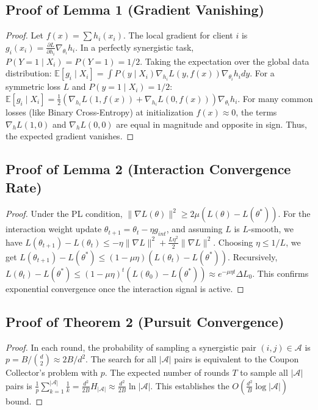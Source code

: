 \documentclass{article}
\theoremstyle{plain}
\theoremstyle{definition}
\newcommand{\E}{\mathbb{E}}
\begin{document}
\subsection{Proof of Lemma 1 (Gradient Vanishing)}
\label{app:gradient_proof}
\begin{proof}
Let $f(x) = \sum h_i(x_i)$. The local gradient for client $i$ is $g_i(x_i) = \frac{\partial L}{\partial h_i} \nabla_{\theta_i} h_i$.
In a perfectly synergistic task, $P(Y=1 \mid X_i) = P(Y=1) = 1/2$.
Taking the expectation over the global data distribution:
$\E[g_i \mid X_i] = \int P(y \mid X_i) \nabla_{h_i} L(y, f(x)) \nabla_{\theta_i} h_i dy$.
For a symmetric loss $L$ and $P(y=1 \mid X_i) = 1/2$:
$\E[g_i \mid X_i] = \frac{1}{2} (\nabla_{h_i} L(1, f(x)) + \nabla_{h_i} L(0, f(x))) \nabla_{\theta_i} h_i$.
For many common losses (like Binary Cross-Entropy) at initialization $f(x) \approx 0$, the terms $\nabla_h L(1, 0)$ and $\nabla_h L(0, 0)$ are equal in magnitude and opposite in sign. Thus, the expected gradient vanishes.
\end{proof}
\subsection{Proof of Lemma 2 (Interaction Convergence Rate)}
\label{app:proof_lemma2}
\begin{proof}
Under the PL condition, $\|\nabla L(\theta)\|^2 \ge 2\mu (L(\theta) - L(\theta^*))$. For the interaction weight update $\theta_{t+1} = \theta_t - \eta g_{int}$, and assuming $L$ is $L$-smooth, we have $L(\theta_{t+1}) - L(\theta_t) \le -\eta \|\nabla L\|^2 + \frac{L\eta^2}{2} \|\nabla L\|^2$.
Choosing $\eta \le 1/L$, we get $L(\theta_{t+1}) - L(\theta^*) \le (1 - \mu \eta) (L(\theta_t) - L(\theta^*))$.
Recursively, $L(\theta_t) - L(\theta^*) \le (1 - \mu \eta)^t (L(\theta_0) - L(\theta^*)) \approx e^{-\mu \eta t} \Delta L_0$.
This confirms exponential convergence once the interaction signal is active.
\end{proof}

\subsection{Proof of Theorem 2 (Pursuit Convergence)}
\label{app:proof_thm2}
\begin{proof}
In each round, the probability of sampling a synergistic pair $(i, j) \in \mathcal{A}$ is $p = B / \binom{d}{2} \approx 2B/d^2$.
The search for all $|\mathcal{A}|$ pairs is equivalent to the Coupon Collector's problem with $p$.
The expected number of rounds $T$ to sample all $|\mathcal{A}|$ pairs is $\frac{1}{p} \sum_{k=1}^{|\mathcal{A}|} \frac{1}{k} = \frac{d^2}{2B} H_{|\mathcal{A}|} \approx \frac{d^2}{2B} \ln |\mathcal{A}|$.
This establishes the $O(\frac{d^2}{B} \log |\mathcal{A}|)$ bound.
\end{proof}
\end{document}
